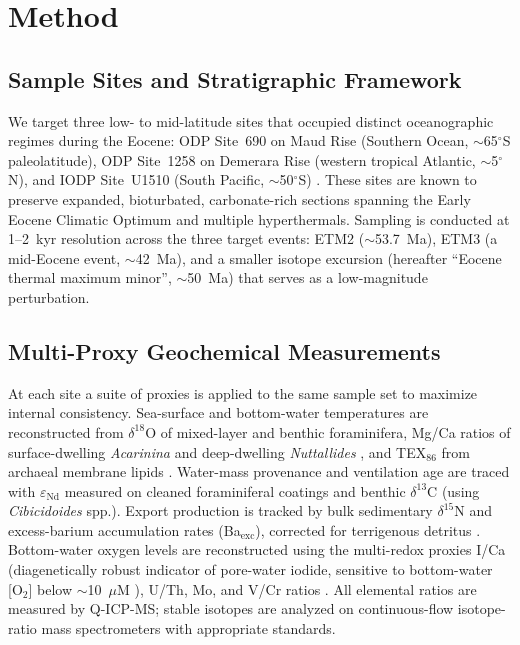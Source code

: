 \documentclass{article}
\begin{document}
\section{Method}
\label{sec:method}

\subsection{Sample Sites and Stratigraphic Framework}
We target three low- to mid-latitude sites that occupied distinct oceanographic regimes during the Eocene: ODP Site~690 on Maud Rise (Southern Ocean, $\sim$65$^\circ$S paleolatitude), ODP Site~1258 on Demerara Rise (western tropical Atlantic, $\sim$5$^\circ$N), and IODP Site~U1510 (South Pacific, $\sim$50$^\circ$S) \cite{Sluijs2006,Stoll2005,Bijl2013}. These sites are known to preserve expanded, bioturbated, carbonate-rich sections spanning the Early Eocene Climatic Optimum and multiple hyperthermals. Sampling is conducted at 1--2~kyr resolution across the three target events: ETM2 ($\sim$53.7~Ma), ETM3 (a mid-Eocene event, $\sim$42~Ma), and a smaller isotope excursion (hereafter ``Eocene thermal maximum minor'', $\sim$50~Ma) that serves as a low-magnitude perturbation. 

\subsection{Multi-Proxy Geochemical Measurements}
At each site a suite of proxies is applied to the same sample set to maximize internal consistency. Sea-surface and bottom-water temperatures are reconstructed from $\delta^{18}$O of mixed-layer and benthic foraminifera, Mg/Ca ratios of surface-dwelling \emph{Acarinina} and deep-dwelling \emph{Nuttallides} \cite{Lear2002}, and TEX$_{86}$ from archaeal membrane lipids \cite{Schouten2002}. Water-mass provenance and ventilation age are traced with $\varepsilon_{\mathrm{Nd}}$ measured on cleaned foraminiferal coatings \cite{Piepgras1980} and benthic $\delta^{13}$C (using \emph{Cibicidoides} spp.). Export production is tracked by bulk sedimentary $\delta^{15}$N \cite{Altabet1994} and excess-barium accumulation rates (Ba$_{\mathrm{exc}}$), corrected for terrigenous detritus \cite{Dean2006}. Bottom-water oxygen levels are reconstructed using the multi-redox proxies I/Ca (diagenetically robust indicator of pore-water iodide, sensitive to bottom-water [O$_{2}$] below $\sim$10~$\mu$M \cite{Lu2008}), U/Th, Mo, and V/Cr ratios \cite{Jaccard2011}. All elemental ratios are measured by Q-ICP-MS; stable isotopes are analyzed on continuous-flow isotope-ratio mass spectrometers with appropriate standards.
\end{document}
